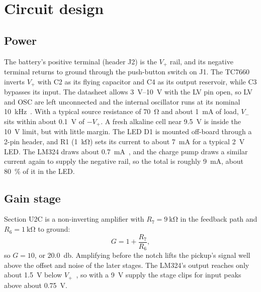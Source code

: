 \documentclass[10pt,letterpaper]{article}
\begin{document}
\section{Circuit design}\label{sec:circuit}
\subsection{Power}
The battery's positive terminal (header J2) is the $V_+$ rail, and its negative terminal returns to ground through the push-button switch on J1. The TC7660 inverts $V_+$ with C2 as its flying capacitor and C4 as its output reservoir, while C3 bypasses its input. The datasheet allows \SIrange{3}{10}{\volt} with the LV pin open, so LV and OSC are left unconnected and the internal oscillator runs at its nominal \SI{10}{\kilo\hertz}~\cite{tc7660}. With a typical source resistance of \SI{70}{\ohm} and about \SI{1}{\milli\ampere} of load, $V_-$ sits within about \SI{0.1}{\volt} of $-V_+$. A fresh alkaline cell near \SI{9.5}{\volt} is inside the \SI{10}{\volt} limit, but with little margin. The LED D1 is mounted off-board through a 2-pin header, and R1 (\SI{1}{\kilo\ohm}) sets its current to about \SI{7}{\milli\ampere} for a typical \SI{2}{\volt} LED. The LM324 draws about \SI{0.7}{\milli\ampere}~\cite{lm324}, and the charge pump draws a similar current again to supply the negative rail, so the total is roughly \SI{9}{\milli\ampere}, about \SI{80}{\percent} of it in the LED.

\subsection{Gain stage}
Section U2C is a non-inverting amplifier with $R_7 = \SI{9}{\kilo\ohm}$ in the feedback path and $R_6 = \SI{1}{\kilo\ohm}$ to ground:
\begin{equation}
  G = 1 + \frac{R_7}{R_6},
\end{equation}
so $G = 10$, or \SI{20.0}{\decibel}. Amplifying before the notch lifts the pickup's signal well above the offset and noise of the later stages. The LM324's output reaches only about \SI{1.5}{\volt} below $V_+$~\cite{lm324}, so with a \SI{9}{\volt} supply the stage clips for input peaks above about \SI{0.75}{\volt}.
\end{document}
